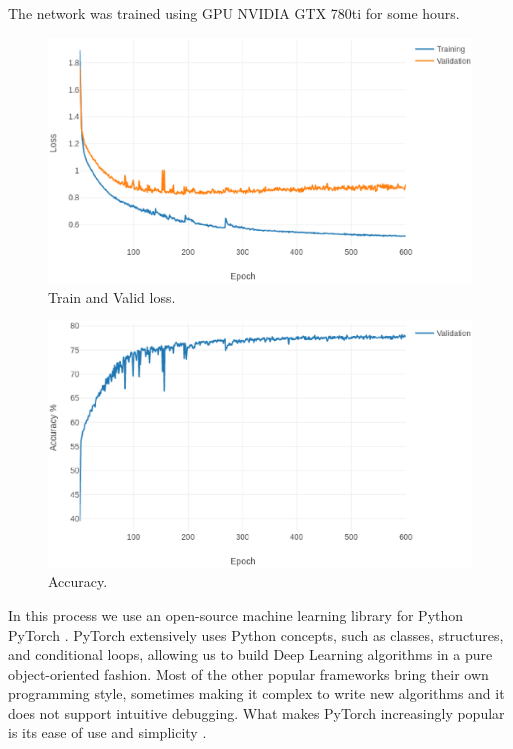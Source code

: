 \documentclass[runningheads]{llncs}
\begin{document}
The network was trained using GPU NVIDIA GTX 780ti for some hours.
\begin{figure}
	\begin{center}
		\includegraphics[width=\textwidth]{loss_600epoch_2x150hidded.eps}
		\caption{Train and Valid loss.} \label{loss}
	\end{center}
\end{figure} 
\begin{figure}
\begin{center}
	\includegraphics[width=\textwidth]{accuracy_600epoch_2x150hidded.eps}
	\caption{Accuracy.} \label{acc}
\end{center}
\end{figure}

In this process we use an open-source machine learning library for Python PyTorch \cite{paszke2017pytorch}. PyTorch extensively uses Python concepts, such as classes, structures, and conditional loops, allowing us to build Deep Learning algorithms in a pure object-oriented fashion. Most of the other popular frameworks bring their own programming style, sometimes making it complex to write new algorithms and it does not support intuitive debugging. What makes PyTorch increasingly popular is its ease of use and simplicity \cite{Subramanian2018}.
\end{document}
